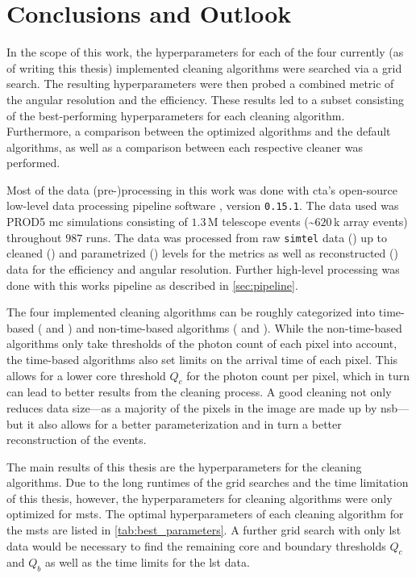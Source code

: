 \chapter{Conclusions and Outlook}
\label{ch:conclusions}

In the scope of this work, the hyperparameters for each of the four currently (as of writing this thesis)
implemented cleaning algorithms were searched via a grid search. The resulting hyperparameters were then
probed \wrt a combined metric of the angular resolution and the efficiency. These results led to a subset
consisting of the best-performing hyperparameters for each cleaning algorithm. Furthermore, a comparison between the
optimized algorithms and the default algorithms, as well as a comparison between each respective
cleaner was performed.

Most of the data (pre-)processing in this work was done with \gls{cta}'s open-source low-level data processing pipeline
software \ctapipe{}, version \texttt{0.15.1}. The data used was PROD5 \gls{mc} simulations consisting of
\(\num{1.3}\)\,M telescope events (\sim\(\num{620}\)\,k array events) throughout \(987\) runs. The data
was processed from raw \texttt{simtel} data (\rzero) up to cleaned (\dloa) and parametrized (\dlob) levels
for the metrics as well as reconstructed (\dlt) data for the efficiency and angular resolution.
Further high-level processing was done with this works pipeline as described in \autoref{sec:pipeline}.

The four implemented cleaning algorithms can be roughly categorized into time-based (\fact{} and \tcc) and non-time-based
algorithms (\tailcuts{} and \mars{}). While the non-time-based algorithms only take thresholds of the photon count of each pixel
into account, the time-based algorithms also set limits on the arrival time of each pixel. This allows
for a lower core threshold \(Q_c\) for the photon count per pixel, which in turn can lead to better
results from the cleaning process. A good cleaning not only reduces data size---as a majority of the
pixels in the image are made up by \gls{nsb}---but it also allows for a better parameterization and in turn
a better reconstruction of the events.

The main results of this thesis are the hyperparameters for the cleaning algorithms.
Due to the long runtimes of the grid searches and the time limitation of this thesis, however, the hyperparameters
for cleaning algorithms were only optimized for \glspl{mst}. The optimal hyperparameters of each cleaning algorithm for
the \glspl{mst} are listed in \autoref{tab:best_parameters}. A further grid search with only \gls{lst}
data would be necessary to find the remaining core and boundary thresholds \(Q_c\) and \(Q_b\) as well
as the time limits for the \gls{lst} data.


